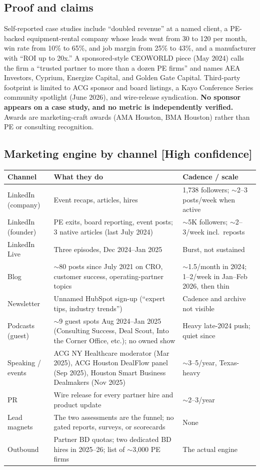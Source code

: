 \documentclass[11pt]{article}
\newcommand{\high}{\textcolor{green!45!black}{\textbf{[High confidence]}}}
\begin{document}
\subsection{Proof and claims}
Self-reported case studies include ``doubled revenue'' at a named client, a PE-backed
equipment-rental company whose leads went from 30 to 120 per month, win rate from 10\%
to 65\%, and job margin from 25\% to 43\%, and a manufacturer with ``ROI up to 20x.'' A
sponsored-style CEOWORLD piece (May 2024) calls the firm a ``trusted partner to more
than a dozen PE firms'' and names AEA Investors, Cyprium, Energize Capital, and
Golden Gate Capital. Third-party footprint is limited to ACG sponsor and board
listings, a Kayo Conference Series community spotlight (June 2026), and wire-release
syndication. \textbf{No sponsor appears on a case study, and no metric is
independently verified.} Awards are marketing-craft awards (AMA Houston, BMA Houston)
rather than PE or consulting recognition.

\subsection{Marketing engine by channel \high}
\begin{center}
\renewcommand{\arraystretch}{1.25}
\small
\begin{tabular}{R{2.6cm} R{6.6cm} R{4.0cm}}
\toprule
\textbf{Channel} & \textbf{What they do} & \textbf{Cadence / scale} \\
\midrule
LinkedIn (company) & Event recaps, articles, hires & 1,738 followers; $\sim$2--3 posts/week when active \\
LinkedIn (founder) & PE exits, board reporting, event posts; 3 native articles (last July 2024) & $\sim$5K followers; $\sim$2--3/week incl.\ reposts \\
LinkedIn Live & Three episodes, Dec 2024--Jan 2025 & Burst, not sustained \\
Blog & $\sim$80 posts since July 2021 on CRO, customer success, operating-partner topics & $\sim$1.5/month in 2024; 1--2/week in Jan--Feb 2026, then thin \\
Newsletter & Unnamed HubSpot sign-up (``expert tips, industry trends'') & Cadence and archive not visible \\
Podcasts (guest) & $\sim$9 guest spots Aug 2024--Jan 2025 (Consulting Success, Deal Scout, Into the Corner Office, etc.); no owned show & Heavy late-2024 push; quiet since \\
Speaking / events & ACG NY Healthcare moderator (Mar 2025), ACG Houston DealFlow panel (Sep 2025), Houston Smart Business Dealmakers (Nov 2025) & $\sim$3--5/year, Texas-heavy \\
PR & Wire release for every partner hire and product update & $\sim$2--3/year \\
Lead magnets & The two assessments are the funnel; no gated reports, surveys, or scorecards & None \\
Outbound & Partner BD quotas; two dedicated BD hires in 2025--26; list of $\sim$3,000 PE firms & The actual engine \\
\bottomrule
\end{tabular}
\end{center}
\end{document}
